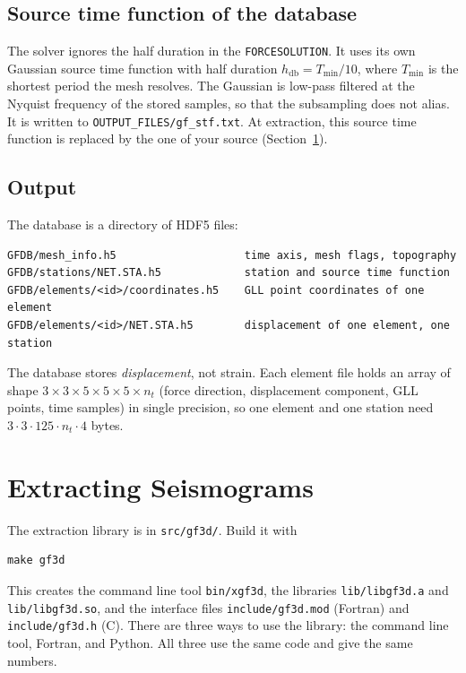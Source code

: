 \subsection{Source time function of the database}

The solver ignores the half duration in the \texttt{FORCESOLUTION}. It uses
its own Gaussian source time function with half duration
$h_{\mathrm{db}} = T_{\mathrm{min}}/10$, where $T_{\mathrm{min}}$ is the
shortest period the mesh resolves. The Gaussian is low-pass filtered at the
Nyquist frequency of the stored samples, so that the subsampling does not
alias. It is written to \texttt{OUTPUT\_FILES/gf\_stf.txt}. At extraction,
this source time function is replaced by the one of your source
(Section~\ref{sec:gf-extract}).

\subsection{Output}

The database is a directory of HDF5 files:
\begin{verbatim}
GFDB/mesh_info.h5                    time axis, mesh flags, topography
GFDB/stations/NET.STA.h5             station and source time function
GFDB/elements/<id>/coordinates.h5    GLL point coordinates of one element
GFDB/elements/<id>/NET.STA.h5        displacement of one element, one station
\end{verbatim}
The database stores \emph{displacement}, not strain. Each element file holds
an array of shape $3\times3\times5\times5\times5\times n_t$ (force direction,
displacement component, GLL points, time samples) in single precision, so one
element and one station need $3\cdot3\cdot125\cdot n_t\cdot4$ bytes.


\section{Extracting Seismograms}\label{sec:gf-extract}

The extraction library is in \texttt{src/gf3d/}. Build it with
\begin{verbatim}
make gf3d
\end{verbatim}
This creates the command line tool \texttt{bin/xgf3d}, the libraries
\texttt{lib/libgf3d.a} and \texttt{lib/libgf3d.so}, and the interface files
\texttt{include/gf3d.mod} (Fortran) and \texttt{include/gf3d.h} (C). There are
three ways to use the library: the command line tool, Fortran, and Python. All three
use the same code and give the same numbers.

